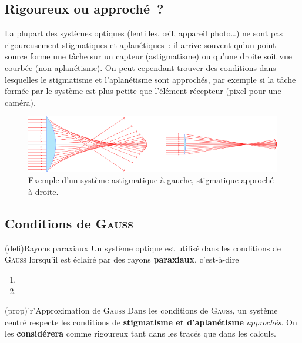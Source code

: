\documentclass[../../main/main.tex]{subfiles}
\begin{document}
\subsection{Rigoureux ou approché~?}

La plupart des systèmes optiques (lentilles, œil, appareil photo…) ne sont pas
rigoureusement stigmatiques et aplanétiques~: il arrive souvent qu'un point
source forme une tâche sur un capteur (astigmatisme) ou qu'une droite soit vue
courbée (non-aplanétisme). On peut cependant trouver des conditions
dans lesquelles le stigmatisme et l'aplanétisme sont approchés, par exemple si
la tâche formée par le système est plus petite que l'élément récepteur (pixel
pour une caméra).

\begin{figure}[htbp]
	\centering
	\includegraphics[scale=1]{stig}
	\caption{Exemple d'un système astigmatique à gauche, stigmatique approché à
		droite.}
	\label{fig:stig}
\end{figure}

\subsection{Conditions de \textsc{Gauss}}

\begin{tcbraster}[raster columns=2, raster equal height=rows]
	\begin{tcb}[label=def:gausscond](defi){Rayons paraxiaux}
		Un système optique est utilisé dans les conditions de \textsc{Gauss} lorsqu'il
		est éclairé par des rayons \textbf{paraxiaux}, c'est-à-dire
		\begin{enumerate}
			\item {}
			\item {}
		\end{enumerate}
	\end{tcb}
	\begin{tcb}[label=prop:gaussprop](prop)'r'{Approximation de \textsc{Gauss}}
		Dans les conditions de \textsc{Gauss}, un système centré respecte les
		conditions de \textbf{stigmatisme et d'aplanétisme} \textit{approchés}. On
		les \textbf{considérera} comme rigoureux tant dans les tracés que dans les
		calculs.
	\end{tcb}
\end{tcbraster}
\end{document}
